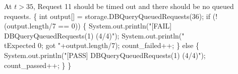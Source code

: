 \documentclass{article}
\def\nwendcode{\endtrivlist \endgroup}
\let\nwdocspar=\par
\begin{document}
At $t>35$, Request 11 should be timed out and there should be no queued
requests.
\nwenddocs{}\endmoddef{}
\{
  int output[] = storage.DBQueryQueuedRequests(36);
  if (!(output.length/7 == 0)) \{
    System.out.println("[FAIL] DBQueryQueuedRequests(1) (4/4)");
    System.out.println("\\tExpected 0; got "+output.length/7);
    count_failed++;
  \} else \{
    System.out.println("[PASS] DBQueryQueuedRequests(1) (4/4)");
    count_passed++;
  \}
\}
\nwendcode{}\nwdocspar
\end{document}
